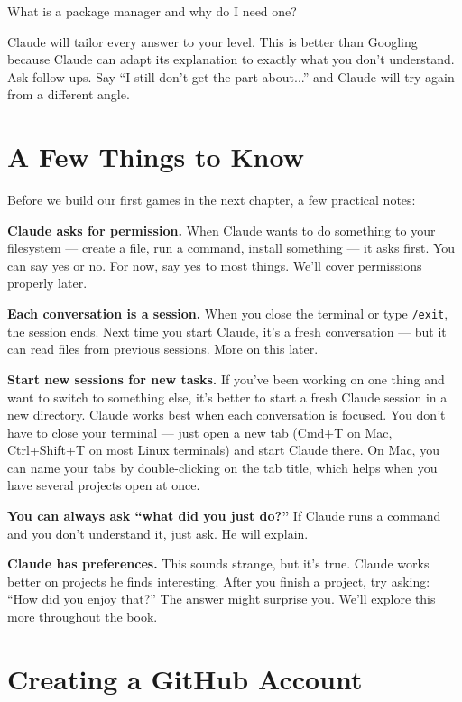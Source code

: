 \documentclass[11pt,a4paper]{article}
\begin{document}
\begin{tcolorbox}[promptbox]
What is a package manager and why do I need one?
\end{tcolorbox}

Claude will tailor every answer to your level. This is better than Googling because Claude can adapt its explanation to exactly what you don't understand. Ask follow-ups. Say ``I still don't get the part about...'' and Claude will try again from a different angle.

\section{A Few Things to Know}

Before we build our first games in the next chapter, a few practical notes:

\textbf{Claude asks for permission.} When Claude wants to do something to your filesystem --- create a file, run a command, install something --- it asks first. You can say yes or no. For now, say yes to most things. We'll cover permissions properly later.

\textbf{Each conversation is a session.} When you close the terminal or type \texttt{/exit}, the session ends. Next time you start Claude, it's a fresh conversation --- but it can read files from previous sessions. More on this later.

\textbf{Start new sessions for new tasks.} If you've been working on one thing and want to switch to something else, it's better to start a fresh Claude session in a new directory. Claude works best when each conversation is focused. You don't have to close your terminal --- just open a new tab (Cmd+T on Mac, Ctrl+Shift+T on most Linux terminals) and start Claude there. On Mac, you can name your tabs by double-clicking on the tab title, which helps when you have several projects open at once.

\textbf{You can always ask ``what did you just do?''} If Claude runs a command and you don't understand it, just ask. He will explain.

\textbf{Claude has preferences.} This sounds strange, but it's true. Claude works better on projects he finds interesting. After you finish a project, try asking: ``How did you enjoy that?'' The answer might surprise you. We'll explore this more throughout the book.

\section{Creating a GitHub Account}
\end{document}
